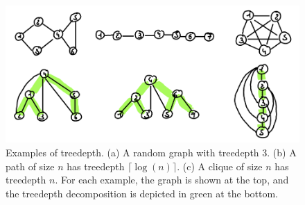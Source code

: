 \begin{figure}
    \includegraphics[width=\textwidth]{figures/treedepth-example.png}
    \caption{Examples of treedepth. (a) A random graph with treedepth 3. (b) A path of size $n$ has treedepth $\lceil\log(n)\rceil$. (c) A clique of size $n$ has treedepth $n$. For each example, the graph is shown at the top, and the treedepth decomposition is depicted in green at the bottom.}
    \label{fig:treedepth-example}
\end{figure}